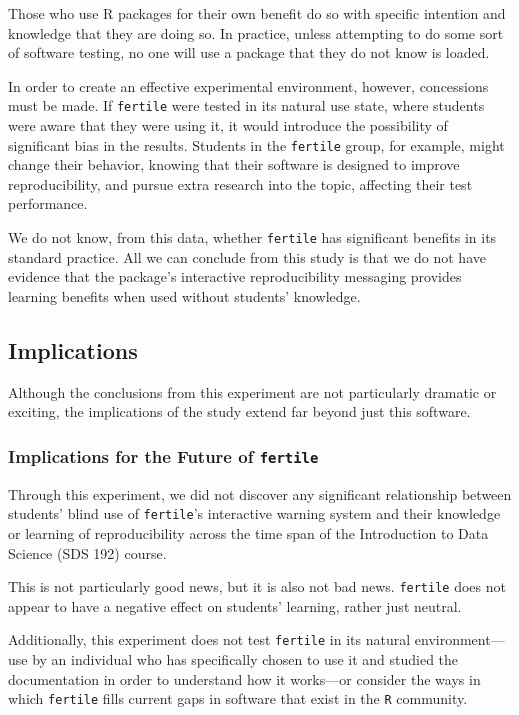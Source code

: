 \documentclass[12pt,twoside]{reedthesis}
\begin{document}
Those who use R packages for their own benefit do so with specific intention and knowledge that they are doing so. In practice, unless attempting to do some sort of software testing, no one will use a package that they do not know is loaded.

In order to create an effective experimental environment, however, concessions must be made. If \texttt{fertile} were tested in its natural use state, where students were aware that they were using it, it would introduce the possibility of significant bias in the results. Students in the \texttt{fertile} group, for example, might change their behavior, knowing that their software is designed to improve reproducibility, and pursue extra research into the topic, affecting their test performance.

We do not know, from this data, whether \texttt{fertile} has significant benefits in its standard practice. All we can conclude from this study is that we do not have evidence that the package's interactive reproducibility messaging provides learning benefits when used without students' knowledge.

\hypertarget{implications}{%
\subsection{Implications}\label{implications}}

Although the conclusions from this experiment are not particularly dramatic or exciting, the implications of the study extend far beyond just this software.

\hypertarget{implications-for-the-future-of-fertile}{%
\subsubsection{\texorpdfstring{Implications for the Future of \texttt{fertile}}{Implications for the Future of fertile}}\label{implications-for-the-future-of-fertile}}

Through this experiment, we did not discover any significant relationship between students' blind use of \texttt{fertile}'s interactive warning system and their knowledge or learning of reproducibility across the time span of the Introduction to Data Science (SDS 192) course.

This is not particularly good news, but it is also not bad news. \texttt{fertile} does not appear to have a negative effect on students' learning, rather just neutral.

Additionally, this experiment does not test \texttt{fertile} in its natural environment---use by an individual who has specifically chosen to use it and studied the documentation in order to understand how it works---or consider the ways in which \texttt{fertile} fills current gaps in software that exist in the \texttt{R} community.
\end{document}
